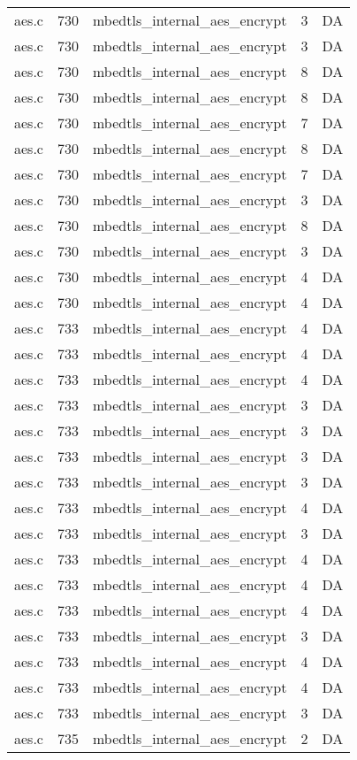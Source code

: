 \begin{table*}
\begin{tabular}{clrrr}
aes.c&730&mbedtls\_internal\_aes\_encrypt&3 &DA\\
aes.c&730&mbedtls\_internal\_aes\_encrypt&3 &DA\\
aes.c&730&mbedtls\_internal\_aes\_encrypt&8 &DA\\
aes.c&730&mbedtls\_internal\_aes\_encrypt&8 &DA\\
aes.c&730&mbedtls\_internal\_aes\_encrypt&7 &DA\\
aes.c&730&mbedtls\_internal\_aes\_encrypt&8 &DA\\
aes.c&730&mbedtls\_internal\_aes\_encrypt&7 &DA\\
aes.c&730&mbedtls\_internal\_aes\_encrypt&3 &DA\\
aes.c&730&mbedtls\_internal\_aes\_encrypt&8 &DA\\
aes.c&730&mbedtls\_internal\_aes\_encrypt&3 &DA\\
aes.c&730&mbedtls\_internal\_aes\_encrypt&4 &DA\\
aes.c&730&mbedtls\_internal\_aes\_encrypt&4 &DA\\
aes.c&733&mbedtls\_internal\_aes\_encrypt&4 &DA\\
aes.c&733&mbedtls\_internal\_aes\_encrypt&4 &DA\\
aes.c&733&mbedtls\_internal\_aes\_encrypt&4 &DA\\
aes.c&733&mbedtls\_internal\_aes\_encrypt&3 &DA\\
aes.c&733&mbedtls\_internal\_aes\_encrypt&3 &DA\\
aes.c&733&mbedtls\_internal\_aes\_encrypt&3 &DA\\
aes.c&733&mbedtls\_internal\_aes\_encrypt&3 &DA\\
aes.c&733&mbedtls\_internal\_aes\_encrypt&4 &DA\\
aes.c&733&mbedtls\_internal\_aes\_encrypt&3 &DA\\
aes.c&733&mbedtls\_internal\_aes\_encrypt&4 &DA\\
aes.c&733&mbedtls\_internal\_aes\_encrypt&4 &DA\\
aes.c&733&mbedtls\_internal\_aes\_encrypt&4 &DA\\
aes.c&733&mbedtls\_internal\_aes\_encrypt&3 &DA\\
aes.c&733&mbedtls\_internal\_aes\_encrypt&4 &DA\\
aes.c&733&mbedtls\_internal\_aes\_encrypt&4 &DA\\
aes.c&733&mbedtls\_internal\_aes\_encrypt&3 &DA\\
aes.c&735&mbedtls\_internal\_aes\_encrypt&2 &DA\\

\end{tabular}
\end{table*}
